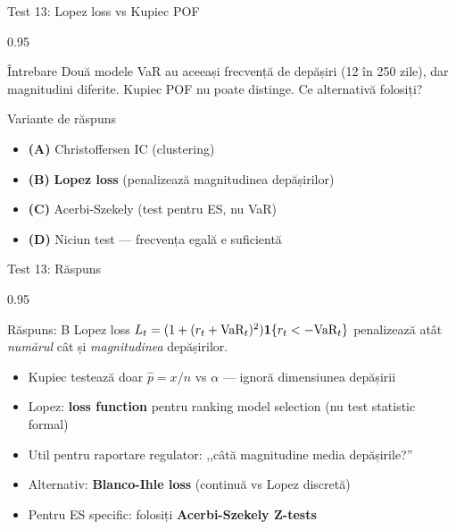 \documentclass[9pt, aspectratio=169, t]{beamer}
\begin{document}
\begin{frame}[shrink=10]{Test 13: Lopez loss vs Kupiec POF}
    \begin{cminipage}{0.95\textwidth}
    \begin{alertblock}{Întrebare}
    Două modele VaR au aceeași frecvență de depășiri (12 în 250 zile), dar magnitudini diferite. Kupiec POF nu poate distinge. Ce alternativă folosiți?
    \end{alertblock}
    \begin{block}{Variante de răspuns}
    \begin{itemize}\setlength{\itemsep}{0pt}
        \item \textbf{(A)} Christoffersen IC (clustering)
        \item \textbf{(B)} \textbf{Lopez loss} (penalizează magnitudinea depășirilor)
        \item \textbf{(C)} Acerbi-Szekely (test pentru ES, nu VaR)
        \item \textbf{(D)} Niciun test --- frecvența egală e suficientă
    \end{itemize}
    \end{block}
    \end{cminipage}
\end{frame}

\begin{frame}[shrink=10]{Test 13: Răspuns}
    \begin{cminipage}{0.95\textwidth}
    \begin{exampleblock}{Răspuns: B}
    Lopez loss $L_t = (1 + (r_t + \text{VaR}_t)^2)\mathbf{1}\{r_t < -\text{VaR}_t\}$ penalizează atât \emph{numărul} cât și \emph{magnitudinea} depășirilor.
    \end{exampleblock}
    \begin{itemize}\setlength{\itemsep}{0pt}
        \item Kupiec testează doar $\hat{p} = x/n$ vs $\alpha$ --- ignoră dimensiunea depășirii
        \item Lopez: \textbf{loss function} pentru ranking model selection (nu test statistic formal)
        \item Util pentru raportare regulator: ,,câtă magnitudine media depășirile?''
        \item Alternativ: \textbf{Blanco-Ihle loss} (continuă vs Lopez discretă)
        \item Pentru ES specific: folosiți \textbf{Acerbi-Szekely Z-tests}
    \end{itemize}
    \end{cminipage}
\end{frame}
\end{document}
